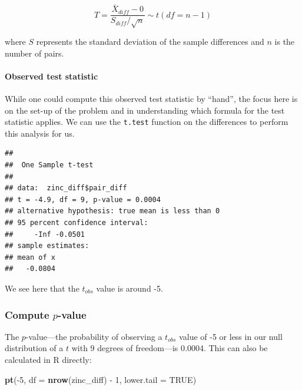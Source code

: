 \documentclass[]{tufte-book}
\newenvironment{Shaded}{\begin{snugshade}}{\end{snugshade}}
\newcommand{\KeywordTok}[1]{\textcolor[rgb]{0.13,0.29,0.53}{\textbf{{#1}}}}
\newcommand{\DataTypeTok}[1]{\textcolor[rgb]{0.13,0.29,0.53}{{#1}}}
\newcommand{\DecValTok}[1]{\textcolor[rgb]{0.00,0.00,0.81}{{#1}}}
\newcommand{\StringTok}[1]{\textcolor[rgb]{0.31,0.60,0.02}{{#1}}}
\newcommand{\OtherTok}[1]{\textcolor[rgb]{0.56,0.35,0.01}{{#1}}}
\newcommand{\NormalTok}[1]{{#1}}
\begin{document}
\[ T =\dfrac{ \bar{X}_{diff} - 0}{ S_{diff} / \sqrt{n} } \sim t (df = n - 1) \]

where \(S\) represents the standard deviation of the sample differences
and \(n\) is the number of pairs.

\paragraph{Observed test statistic}\label{observed-test-statistic-4}

While one could compute this observed test statistic by ``hand'', the
focus here is on the set-up of the problem and in understanding which
formula for the test statistic applies. We can use the \texttt{t.test}
function on the differences to perform this analysis for us.

\begin{Shaded}
\end{Shaded}

\begin{verbatim}
## 
##  One Sample t-test
## 
## data:  zinc_diff$pair_diff
## t = -4.9, df = 9, p-value = 0.0004
## alternative hypothesis: true mean is less than 0
## 95 percent confidence interval:
##     -Inf -0.0501
## sample estimates:
## mean of x 
##   -0.0804
\end{verbatim}

We see here that the \(t_{obs}\) value is around -5.

\subsubsection{\texorpdfstring{Compute
\(p\)-value}{Compute p-value}}\label{compute-p-value-3}

The \(p\)-value---the probability of observing a \(t_{obs}\) value of -5
or less in our null distribution of a \(t\) with 9 degrees of
freedom---is 0.0004. This can also be calculated in R directly:

\begin{Shaded}
\begin{Highlighting}[]
\KeywordTok{pt}\NormalTok{(-}\DecValTok{5}\NormalTok{, }\DataTypeTok{df =} \KeywordTok{nrow}\NormalTok{(zinc_diff) -}\StringTok{ }\DecValTok{1}\NormalTok{, }\DataTypeTok{lower.tail =} \OtherTok{TRUE}\NormalTok{)}
\end{Highlighting}
\end{Shaded}
\end{document}

